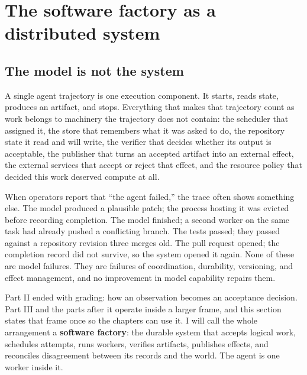 \chapter*{The software factory as a distributed system}
\label{part3-software-factory-distributed-system}

\hypertarget{the-model-is-not-the-system}{%
\section*{The model is not the system}\label{the-model-is-not-the-system}}

A single agent trajectory is one execution component. It starts, reads state, produces an artifact, and stops. Everything that makes that trajectory count as work belongs to machinery the trajectory does not contain: the scheduler that assigned it, the store that remembers what it was asked to do, the repository state it read and will write, the verifier that decides whether its output is acceptable, the publisher that turns an accepted artifact into an external effect, the external services that accept or reject that effect, and the resource policy that decided this work deserved compute at all.

When operators report that ``the agent failed,'' the trace often shows something else. The model produced a plausible patch; the process hosting it was evicted before recording completion. The model finished; a second worker on the same task had already pushed a conflicting branch. The tests passed; they passed against a repository revision three merges old. The pull request opened; the completion record did not survive, so the system opened it again. None of these are model failures. They are failures of coordination, durability, versioning, and effect management, and no improvement in model capability repairs them.

Part II ended with grading: how an observation becomes an acceptance decision. Part III and the parts after it operate inside a larger frame, and this section states that frame once so the chapters can use it. I will call the whole arrangement a \textbf{software factory}: the durable system that accepts logical work, schedules attempts, runs workers, verifies artifacts, publishes effects, and reconciles disagreement between its records and the world. The agent is one worker inside it.


